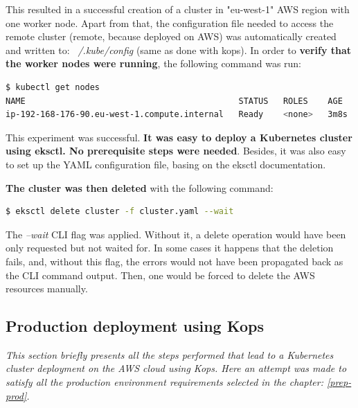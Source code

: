 This resulted in a successful creation of a cluster in "eu-west-1" AWS region with one worker node. Apart from that, the configuration file needed to access the remote cluster (remote, because deployed on AWS) was automatically created and written to: \textit{~/.kube/config} (same as done with kops). In order to \textbf{verify that the worker nodes were running}, the following command was run:
\begin{lstlisting}[basicstyle=\tiny,caption={Command used to list Kubernetes worker nodes to verify that one such node was running},captionpos=b,language=Bash,xleftmargin=1cm]
$ kubectl get nodes
NAME                                           STATUS   ROLES    AGE    VERSION
ip-192-168-176-90.eu-west-1.compute.internal   Ready    <none>   3m8s   v1.16.8
\end{lstlisting}

This experiment was successful. \textbf{It was easy to deploy a Kubernetes cluster using eksctl. No prerequisite steps were needed}. Besides, it was also easy to set up the YAML configuration file, basing on the eksctl documentation\cite{eksctl-creating-clusters}.


\textbf{The cluster was then deleted} with the following command:
\begin{lstlisting}[basicstyle=\tiny,caption={Command used to delete Kubernetes cluster with eksctl},captionpos=b,language=Bash,xleftmargin=1cm]
$ eksctl delete cluster -f cluster.yaml --wait
\end{lstlisting}

The \textit{--wait} CLI flag was applied. Without it, a delete operation would have been only requested but not waited for. In some cases it happens that the deletion fails, and, without this flag, the errors would not have been propagated back as the CLI command output. Then, one would be forced to delete the AWS resources manually\cite{eksctl-creating-clusters}.


\subsection{Production deployment using Kops}
\textit{This section briefly presents all the steps performed that lead to a Kubernetes cluster deployment on the AWS cloud using Kops. Here an attempt was made to satisfy all the production environment requirements selected in the chapter: \ref{prep-prod}.}
\\

